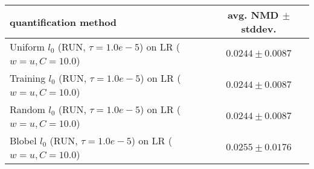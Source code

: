 \begin{tabular}{lc}
  \toprule
  quantification method & avg. NMD $\pm$ stddev. \\
  \midrule
  Uniform $l_0$ (RUN, $\tau=1.0e-5$) on LR ($w=u, C=10.0$) & $\mathbf{0.0244 \pm 0.0087}$ \\
  Training $l_0$ (RUN, $\tau=1.0e-5$) on LR ($w=u, C=10.0$) & $\mathbf{0.0244 \pm 0.0087}$ \\
  Random $l_0$ (RUN, $\tau=1.0e-5$) on LR ($w=u, C=10.0$) & $\mathbf{0.0244 \pm 0.0087}$ \\
  Blobel $l_0$ (RUN, $\tau=1.0e-5$) on LR ($w=u, C=10.0$) & $\mathbf{0.0255 \pm 0.0176}$ \\
  \bottomrule
\end{tabular}
